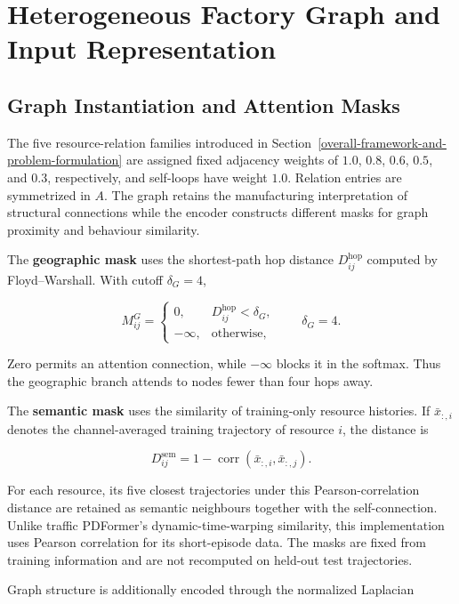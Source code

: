 \section{Heterogeneous Factory Graph and Input Representation}\label{heterogeneous-factory-graph-and-input-representation}

\subsection{Graph Instantiation and Attention Masks}\label{graph-instantiation-and-attention-masks}

The five resource-relation families introduced in Section~\ref{overall-framework-and-problem-formulation} are assigned fixed adjacency weights of \(1.0\), \(0.8\), \(0.6\), \(0.5\), and \(0.3\), respectively, and self-loops have weight \(1.0\). Relation entries are symmetrized in \(A\). The graph retains the manufacturing interpretation of structural connections while the encoder constructs different masks for graph proximity and behaviour similarity.

The \textbf{geographic mask} uses the shortest-path hop distance \(D^{\mathrm{hop}}_{ij}\) computed by Floyd--Warshall. With cutoff \(\delta_G=4\),

\[
M^G_{ij}=\begin{cases}
0,&D^{\mathrm{hop}}_{ij}<\delta_G,\\
-\infty,&\text{otherwise},
\end{cases}\qquad\delta_G=4.
\]

Zero permits an attention connection, while \(-\infty\) blocks it in the softmax. Thus the geographic branch attends to nodes fewer than four hops away.

The \textbf{semantic mask} uses the similarity of training-only resource histories. If \(\bar{x}_{:,i}\) denotes the channel-averaged training trajectory of resource \(i\), the distance is

\[
D^{\mathrm{sem}}_{ij}=1-\operatorname{corr}(\bar{x}_{:,i},\bar{x}_{:,j}).
\]

For each resource, its five closest trajectories under this Pearson-correlation distance are retained as semantic neighbours together with the self-connection. Unlike traffic PDFormer's dynamic-time-warping similarity, this implementation uses Pearson correlation for its short-episode data. The masks are fixed from training information and are not recomputed on held-out test trajectories.

Graph structure is additionally encoded through the normalized Laplacian

